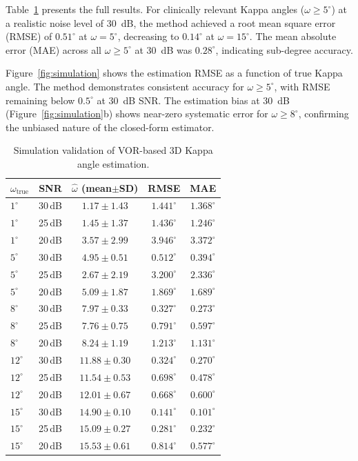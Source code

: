 \documentclass[review,numbers,sort&compress]{elsarticle}
\begin{document}
Table~\ref{tab:simulation} presents the full results. For clinically relevant Kappa angles ($\omega \geq 5^\circ$) at a realistic noise level of 30~dB, the method achieved a root mean square error (RMSE) of $0.51^\circ$ at $\omega = 5^\circ$, decreasing to $0.14^\circ$ at $\omega = 15^\circ$. The mean absolute error (MAE) across all $\omega \geq 5^\circ$ at 30~dB was $0.28^\circ$, indicating sub-degree accuracy.

Figure~\ref{fig:simulation} shows the estimation RMSE as a function of true Kappa angle. The method demonstrates consistent accuracy for $\omega \geq 5^\circ$, with RMSE remaining below $0.5^\circ$ at 30~dB SNR. The estimation bias at 30~dB (Figure~\ref{fig:simulation}b) shows near-zero systematic error for $\omega \geq 8^\circ$, confirming the unbiased nature of the closed-form estimator.

\begin{table}[t]
\caption{Simulation validation of VOR-based 3D Kappa angle estimation.}
\label{tab:simulation}
\centering
\small
\begin{tabular}{lcccc}
\toprule
$\omega_{\text{true}}$ & SNR & $\hat{\omega}$ (mean$\pm$SD) & RMSE & MAE \\
\midrule
$1^\circ$ & 30\,dB & $1.17\pm1.43$ & $1.441^\circ$ & $1.368^\circ$ \\
$1^\circ$ & 25\,dB & $1.45\pm1.37$ & $1.436^\circ$ & $1.246^\circ$ \\
$1^\circ$ & 20\,dB & $3.57\pm2.99$ & $3.946^\circ$ & $3.372^\circ$ \\
\addlinespace
$5^\circ$ & 30\,dB & $4.95\pm0.51$ & $0.512^\circ$ & $0.394^\circ$ \\
$5^\circ$ & 25\,dB & $2.67\pm2.19$ & $3.200^\circ$ & $2.336^\circ$ \\
$5^\circ$ & 20\,dB & $5.09\pm1.87$ & $1.869^\circ$ & $1.689^\circ$ \\
\addlinespace
$8^\circ$ & 30\,dB & $7.97\pm0.33$ & $0.327^\circ$ & $0.273^\circ$ \\
$8^\circ$ & 25\,dB & $7.76\pm0.75$ & $0.791^\circ$ & $0.597^\circ$ \\
$8^\circ$ & 20\,dB & $8.24\pm1.19$ & $1.213^\circ$ & $1.131^\circ$ \\
\addlinespace
$12^\circ$ & 30\,dB & $11.88\pm0.30$ & $0.324^\circ$ & $0.270^\circ$ \\
$12^\circ$ & 25\,dB & $11.54\pm0.53$ & $0.698^\circ$ & $0.478^\circ$ \\
$12^\circ$ & 20\,dB & $12.01\pm0.67$ & $0.668^\circ$ & $0.600^\circ$ \\
\addlinespace
$15^\circ$ & 30\,dB & $14.90\pm0.10$ & $0.141^\circ$ & $0.101^\circ$ \\
$15^\circ$ & 25\,dB & $15.09\pm0.27$ & $0.281^\circ$ & $0.232^\circ$ \\
$15^\circ$ & 20\,dB & $15.53\pm0.61$ & $0.814^\circ$ & $0.577^\circ$ \\
\bottomrule
\end{tabular}
\end{table}
\end{document}
